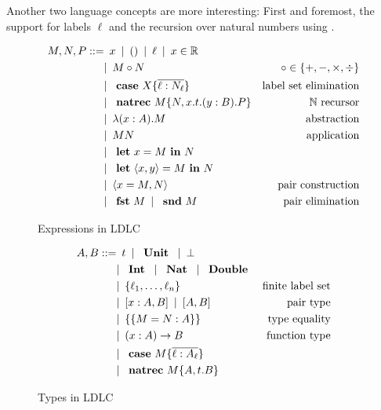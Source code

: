 Another two language concepts are more interesting: First and foremost, the support for labels $\ell$ and the recursion over natural numbers using \natrec.

\begin{figure}
\begin{align*}
 M,N,P ::=
    & \enspace x \enspace|\enspace
      () \enspace|\enspace
      \ell \enspace|\enspace
      x \in \mathbb{R} \\
    & |\enspace M \circ N & \circ \in \{+,-,\times,\div\} \\
    & |\enspace \text{ \textbf{case} } X \{\overline{\ell : N_\ell}\} & \text{label set elimination} \\
    & |\enspace \text{ \textbf{natrec} } M \{ N, x . t . (y : B) . P \} & \mathbb{N}\text{ recursor} \\
    & |\enspace \lambda (x : A).M & \text{abstraction} \\
    & |\enspace M N & \text{application}\\
    & |\enspace \text{ \textbf{let} } x = M \text{ \textbf{in} } N \\
    & |\enspace \text{ \textbf{let} } \langle x, y \rangle = M \text{ \textbf{in} } N \\
    & |\enspace \langle x = M, N \rangle & \text{pair construction}\\
    & |\enspace \text{ \textbf{fst} } M \enspace|\enspace \text{ \textbf{snd} } M & \text{pair elimination}
\end{align*}
\caption{Expressions in LDLC}
\label{fig:ldlc-expressions}
\end{figure}

\begin{figure}
\begin{align*}
 A, B ::=
    & \enspace t \enspace|\enspace
      \text{ \textbf{Unit} } \enspace|\enspace
      \bot \\
    & |\enspace \text{ \textbf{Int} } \enspace|\enspace
      \text{ \textbf{Nat} } \enspace|\enspace
      \text{ \textbf{Double} } \\
    & |\enspace \{ \ell_1, \dots, \ell_n \} & \text{finite label set} \\
    & |\enspace [x:A,B] \enspace|\enspace [A,B] & \text{pair type} \\
    & |\enspace \{\{ M = N : A \}\} & \text{type equality} \\
    & |\enspace (x:A) \rightarrow B & \text{function type} \\
    & |\enspace \text{ \textbf{case} } M \{\overline{\ell : A_\ell}\} \\
    & |\enspace \text{ \textbf{natrec} } M \{ A, t.B \}
\end{align*}
\caption{Types in LDLC}
\label{fig:ldlc-types}
\end{figure}

